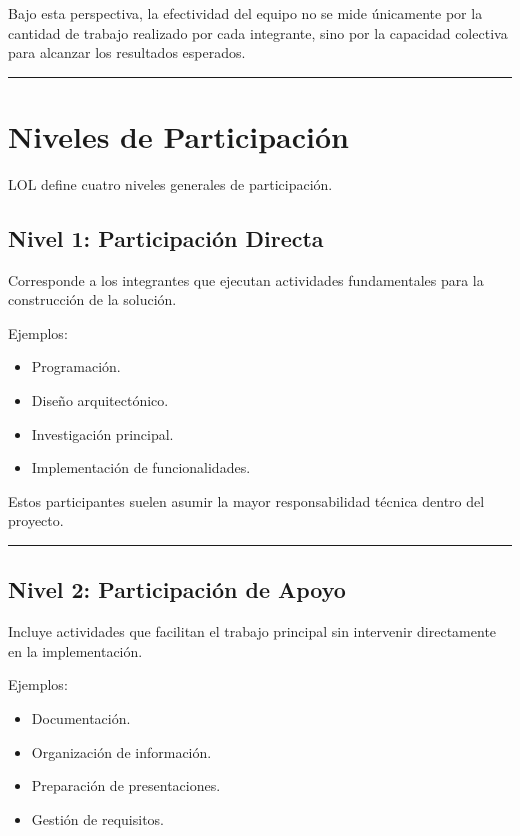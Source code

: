 \documentclass[14pt,a4paper,oneside]{extbook}
\begin{document}
Bajo esta perspectiva, la efectividad del equipo no se mide únicamente por la cantidad de trabajo realizado por cada integrante, sino por la capacidad colectiva para alcanzar los resultados esperados.

\par\vspace{1.5em}\noindent\hfill\rule{0.25\textwidth}{0.6pt}\hfill\par\vspace{1.5em}

\section{Niveles de Participación}

LOL define cuatro niveles generales de participación.

\subsection{Nivel 1: Participación Directa}

Corresponde a los integrantes que ejecutan actividades fundamentales para la construcción de la solución.

Ejemplos:

\begin{itemize}
\item Programación.
\item Diseño arquitectónico.
\item Investigación principal.
\item Implementación de funcionalidades.
\end{itemize}

Estos participantes suelen asumir la mayor responsabilidad técnica dentro del proyecto.

\par\vspace{1.5em}\noindent\hfill\rule{0.25\textwidth}{0.6pt}\hfill\par\vspace{1.5em}

\subsection{Nivel 2: Participación de Apoyo}

Incluye actividades que facilitan el trabajo principal sin intervenir directamente en la implementación.

Ejemplos:

\begin{itemize}
\item Documentación.
\item Organización de información.
\item Preparación de presentaciones.
\item Gestión de requisitos.
\end{itemize}
\end{document}
